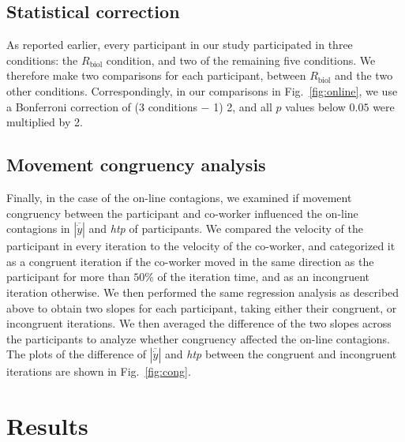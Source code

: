 \documentclass[a4paper, 12pt, oneside]{Thesis}  %
\begin{document}
\subsection{Statistical correction}
As reported earlier, every participant in our study participated in three conditions: the $R_{\text{biol}}$ condition, and two of the remaining five conditions. We therefore make two comparisons for each participant, between $R_{\text{biol}}$ and the two other conditions. Correspondingly, in our comparisons in Fig.~\ref{fig:online}, we use a Bonferroni correction of (3 conditions $-$ 1) 2, and all $p$ values below $0.05$ were multiplied by 2.

\subsection{Movement congruency analysis} \label{congSec}

Finally, in the case of the on-line contagions, we examined if movement congruency between the participant and co-worker influenced the on-line contagions in $|\overline{\dot{y}}|$ and {\it htp} of participants. We compared the velocity of the participant in every iteration to the velocity of the co-worker, and categorized it as a congruent iteration if the co-worker moved in the same direction as the participant for more than $50\%$ of the iteration time, and as an incongruent iteration otherwise. We then performed the same regression analysis as described above to obtain two slopes for each participant, taking either their congruent, or incongruent iterations. We then averaged the difference of the two slopes across the participants to analyze whether congruency affected the on-line contagions. The plots of the difference of $|\overline{\dot{y}}|$ and {\it htp} between the congruent and incongruent iterations are shown in Fig.~\ref{fig:cong}.



\clearpage
\section{Results}
\end{document}
